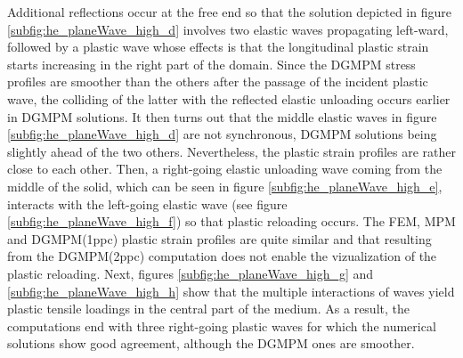 Additional reflections occur at the free end so that the solution depicted in figure \ref{subfig:he_planeWave_high_d} involves two elastic waves propagating left-ward, followed by a plastic wave whose effects is that the longitudinal plastic strain starts increasing in the right part of the domain.
Since the DGMPM stress profiles are smoother than the others after the passage of the incident plastic wave, the colliding of the latter with the reflected elastic unloading occurs earlier in DGMPM solutions.
It then turns out that the middle elastic waves in figure \ref{subfig:he_planeWave_high_d} are not synchronous, DGMPM solutions being slightly ahead of the two others.
Nevertheless, the plastic strain profiles are rather close to each other.
Then, a right-going elastic unloading wave coming from the middle of the solid, which can be seen in figure \ref{subfig:he_planeWave_high_e}, interacts with the left-going elastic wave (see figure \ref{subfig:he_planeWave_high_f}) so that plastic reloading occurs.
The FEM, MPM and DGMPM(1ppc) plastic strain profiles are quite similar and that resulting from the DGMPM(2ppc) computation does not enable the vizualization of the plastic reloading.
Next, figures \ref{subfig:he_planeWave_high_g} and \ref{subfig:he_planeWave_high_h} show that the multiple interactions of waves yield plastic tensile loadings in the central part of the medium.
As a result, the computations end with three right-going plastic waves for which the numerical solutions show good agreement, although the DGMPM ones are smoother.




